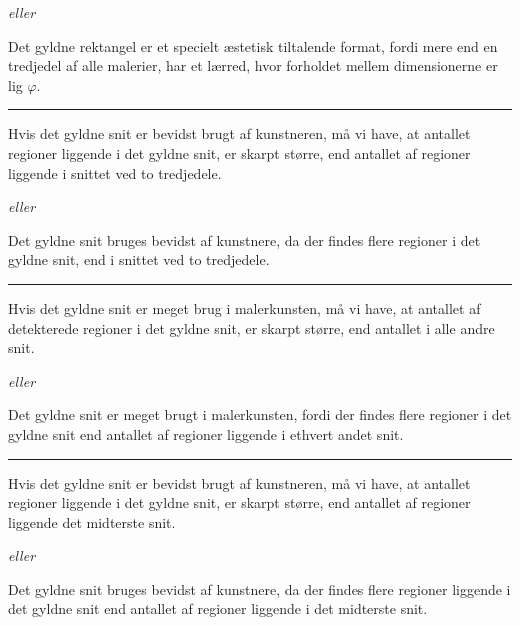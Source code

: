 {\emph{eller}

\begin{hypotese}
    Det gyldne rektangel er et specielt æstetisk tiltalende format,
    fordi mere end en tredjedel af alle malerier, har et lærred, hvor
    forholdet mellem dimensionerne  er lig $\varphi$.
\end{hypotese}

\hrule

\begin{hypotese}
    Hvis det gyldne snit er bevidst brugt af kunstneren, må vi have, at
    antallet regioner liggende i det gyldne snit, er skarpt større, end
    antallet af regioner liggende i snittet ved to tredjedele.
\end{hypotese}

\emph{eller}

\begin{hypotese}
    Det gyldne snit bruges bevidst af kunstnere, da der findes flere
    regioner i det gyldne snit, end i snittet ved to tredjedele.
\end{hypotese}

\hrule

\begin{hypotese}
    Hvis det gyldne snit er meget brug i malerkunsten, må vi have, at
    antallet af detekterede regioner i det gyldne snit, er skarpt
    større, end antallet i alle andre snit.
\end{hypotese}

\emph{eller}

\begin{hypotese}
    Det gyldne snit er meget brugt i malerkunsten, fordi der findes
    flere regioner i det gyldne snit end antallet af regioner liggende i
    ethvert andet snit.
\end{hypotese}

\hrule

\begin{hypotese}
    Hvis det gyldne snit er bevidst brugt af kunstneren, må vi have, at
    antallet regioner liggende i det gyldne snit, er skarpt større, end
    antallet af regioner liggende det midterste snit.
\end{hypotese}

\emph{eller}

\begin{hypotese}
    Det gyldne snit bruges bevidst af kunstnere, da der findes flere
    regioner liggende i det gyldne snit end antallet af regioner
    liggende i det midterste snit.
\end{hypotese}

}
